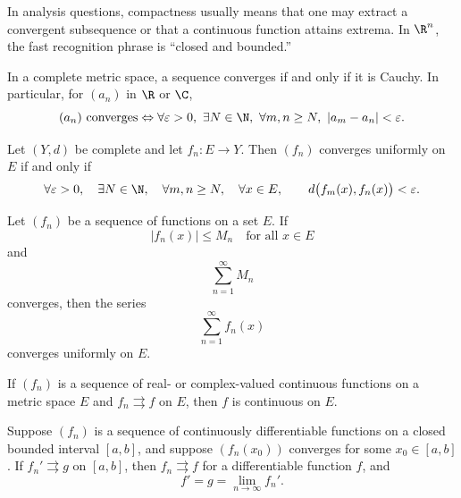     \begin{strategy}
        In analysis questions, compactness usually means that one may extract a
        convergent subsequence or that a continuous function attains extrema.
        In $\R^n$, the fast recognition phrase is ``closed and bounded.''
    \end{strategy}

    \begin{theorem}
        In a complete metric space, a sequence converges if and only if it is
        Cauchy. In particular, for $(a_n)$ in $\R$ or $\C$,
        \[
            (a_n)\text{ converges}
            \Leftrightarrow
            \forall\varepsilon>0,
            \ \exists N\in\N,
            \ \forall m,n\geq N,
            \ |a_m-a_n|<\varepsilon.
        \]
    \end{theorem}

    \begin{theorem}
        Let $(Y,d)$ be complete and let $f_n\colon E\to Y$. Then $(f_n)$ converges
        uniformly on $E$ if and only if
        \[
            \forall\varepsilon>0,
            \quad
            \exists N\in\N,
            \quad
            \forall m,n\geq N,
            \quad
            \forall x\in E,
            \qquad
            d\bigl(f_m(x),f_n(x)\bigr)<\varepsilon.
        \]
    \end{theorem}

    \begin{theorem}
        Let $(f_n)$ be a sequence of functions on a set $E$. If
        \[
            |f_n(x)|\leq M_n
            \quad\text{for all }x\in E
        \]
        and
        \[
            \sum_{n=1}^{\infty}M_n
        \]
        converges, then the series
        \[
            \sum_{n=1}^{\infty} f_n(x)
        \]
        converges uniformly on $E$.
    \end{theorem}

    \begin{theorem}
        If $(f_n)$ is a sequence of real- or complex-valued continuous functions
        on a metric space $E$ and $f_n\rightrightarrows f$ on $E$, then $f$ is continuous
        on $E$.
    \end{theorem}

    \begin{theorem}
        Suppose $(f_n)$ is a sequence of continuously differentiable functions
        on a closed bounded interval $[a,b]$, and suppose $(f_n(x_0))$
        converges for some $x_0\in[a,b]$. If $f_n'\rightrightarrows g$ on
        $[a,b]$, then $f_n\rightrightarrows f$ for a differentiable function
        $f$, and
        \[
            f'=g=\lim\limits_{n\to\infty} f_n'.
        \]
    \end{theorem}


